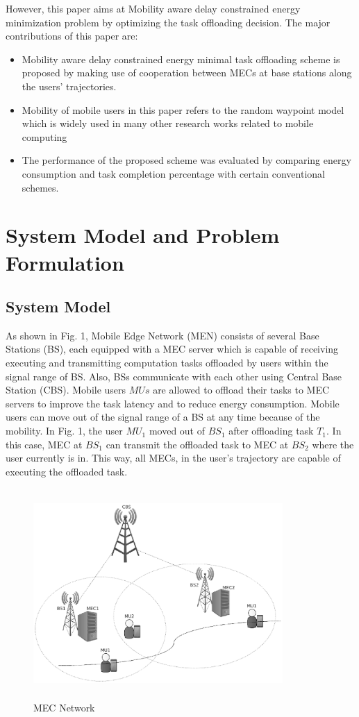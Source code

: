 \documentclass[conference]{IEEEtran}
\begin{document}
	However, this paper aims at Mobility aware delay constrained energy minimization problem by optimizing the task offloading decision. The major contributions of this paper are:
\begin{itemize}
\item Mobility aware delay constrained energy minimal task offloading scheme is proposed by making use of cooperation between MECs at base stations along the users’ trajectories.
\item Mobility of mobile users in this paper refers to the random waypoint model which is widely used in many other research works related to mobile computing
\item The performance of the proposed scheme was evaluated by comparing energy consumption and task completion percentage with certain conventional schemes.
\end{itemize}


\section{System Model and Problem Formulation}

\subsection{System Model}
As shown in Fig. 1, Mobile Edge Network (MEN) consists of several Base Stations (BS), each equipped with a MEC server which is capable of receiving executing and transmitting computation tasks offloaded by users within the signal range of BS. Also, BSs communicate with each other using Central Base Station (CBS). Mobile users $MUs$ are allowed to offload their tasks to MEC servers to improve the task latency and to reduce energy consumption. Mobile users can move out of the signal range of a BS at any time because of the mobility. In Fig. 1, the user $MU_1$ moved out of $BS_1$ after offloading task $T_1$. In this case, MEC at $BS_1$ can transmit the offloaded task to MEC at $BS_2$ where the user currently is in. This way, all MECs, in the user's trajectory are capable of executing the offloaded task. 

 \begin{figure}
\centerline{\includegraphics[width=9.5cm, height=8cm]{F1MECNetwork.eps}}
\caption{MEC Network}
\label{fig.1}
\end{figure}
\end{document}
